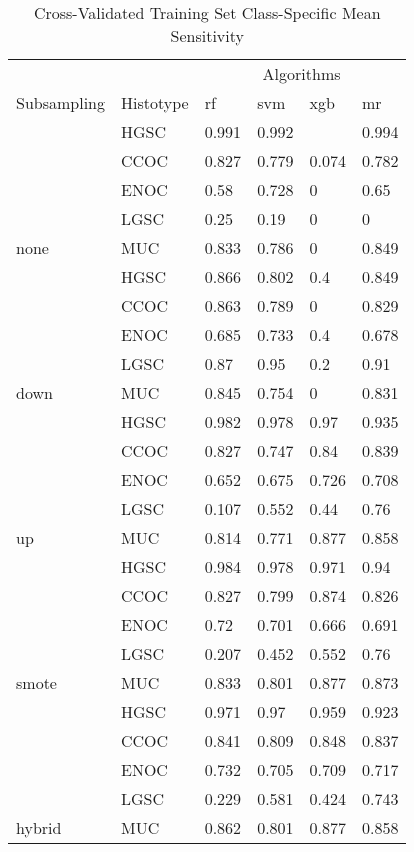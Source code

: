 \documentclass[
]{report}
\begin{document}
\begin{table}

\caption{\label{tab:train-sens-class-table}Cross-Validated Training Set Class-Specific Mean Sensitivity}
\centering
\begin{tabular}[t]{l|l|l|l|l|l}
\hline
\multicolumn{2}{c|}{ } & \multicolumn{4}{c}{Algorithms} \\
\cline{3-6}
Subsampling & Histotype & rf & svm & xgb & mr\\
\hline
 & HGSC & 0.991 & 0.992 & \cellcolor[HTML]{90ee90}{1} & 0.994\\
\cline{2-6}
 & CCOC & 0.827 & 0.779 & 0.074 & 0.782\\
\cline{2-6}
 & ENOC & 0.58 & 0.728 & 0 & 0.65\\
\cline{2-6}
 & LGSC & 0.25 & 0.19 & 0 & 0\\
\cline{2-6}
\multirow{-5}{*}{\raggedright\arraybackslash none} & MUC & 0.833 & 0.786 & 0 & 0.849\\
\cline{1-6}
 & HGSC & 0.866 & 0.802 & 0.4 & 0.849\\
\cline{2-6}
 & CCOC & 0.863 & 0.789 & 0 & 0.829\\
\cline{2-6}
 & ENOC & 0.685 & 0.733 & 0.4 & 0.678\\
\cline{2-6}
 & LGSC & 0.87 & 0.95 & 0.2 & 0.91\\
\cline{2-6}
\multirow{-5}{*}{\raggedright\arraybackslash down} & MUC & 0.845 & 0.754 & 0 & 0.831\\
\cline{1-6}
 & HGSC & 0.982 & 0.978 & 0.97 & 0.935\\
\cline{2-6}
 & CCOC & 0.827 & 0.747 & 0.84 & 0.839\\
\cline{2-6}
 & ENOC & 0.652 & 0.675 & 0.726 & 0.708\\
\cline{2-6}
 & LGSC & 0.107 & 0.552 & 0.44 & 0.76\\
\cline{2-6}
\multirow{-5}{*}{\raggedright\arraybackslash up} & MUC & 0.814 & 0.771 & 0.877 & 0.858\\
\cline{1-6}
 & HGSC & 0.984 & 0.978 & 0.971 & 0.94\\
\cline{2-6}
 & CCOC & 0.827 & 0.799 & 0.874 & 0.826\\
\cline{2-6}
 & ENOC & 0.72 & 0.701 & 0.666 & 0.691\\
\cline{2-6}
 & LGSC & 0.207 & 0.452 & 0.552 & 0.76\\
\cline{2-6}
\multirow{-5}{*}{\raggedright\arraybackslash smote} & MUC & 0.833 & 0.801 & 0.877 & 0.873\\
\cline{1-6}
 & HGSC & 0.971 & 0.97 & 0.959 & 0.923\\
\cline{2-6}
 & CCOC & 0.841 & 0.809 & 0.848 & 0.837\\
\cline{2-6}
 & ENOC & 0.732 & 0.705 & 0.709 & 0.717\\
\cline{2-6}
 & LGSC & 0.229 & 0.581 & 0.424 & 0.743\\
\cline{2-6}
\multirow{-5}{*}{\raggedright\arraybackslash hybrid} & MUC & 0.862 & 0.801 & 0.877 & 0.858\\
\hline
\end{tabular}
\end{table}
\end{document}
